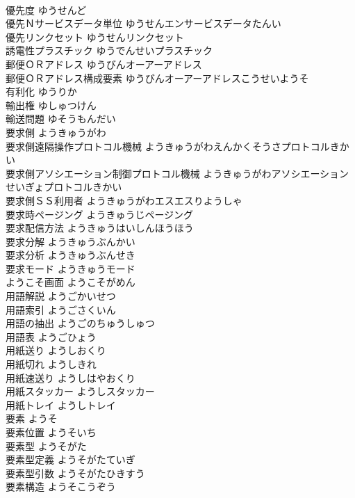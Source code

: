 \documentclass[8pt]{extreport}
\begin{document}
\begin{CJK}{UTF8}{min}
\\	優先度	ゆうせんど	
\\	優先Ｎサービスデータ単位	ゆうせんエンサービスデータたんい	
\\	優先リンクセット	ゆうせんリンクセット	
\\	誘電性プラスチック	ゆうでんせいプラスチック	
\\	郵便ＯＲアドレス	ゆうびんオーアーアドレス	
\\	郵便ＯＲアドレス構成要素	ゆうびんオーアーアドレスこうせいようそ	
\\	有利化	ゆうりか	
\\	輸出権	ゆしゅつけん	
\\	輸送問題	ゆそうもんだい	
\\	要求側	ようきゅうがわ	
\\	要求側遠隔操作プロトコル機械	ようきゅうがわえんかくそうさプロトコルきかい	
\\	要求側アソシエーション制御プロトコル機械	ようきゅうがわアソシエーションせいぎょプロトコルきかい	
\\	要求側ＳＳ利用者	ようきゅうがわエスエスりようしゃ	
\\	要求時ページング	ようきゅうじページング	
\\	要求配信方法	ようきゅうはいしんほうほう	
\\	要求分解	ようきゅうぶんかい	
\\	要求分析	ようきゅうぶんせき	
\\	要求モード	ようきゅうモード	
\\	ようこそ画面	ようこそがめん	
\\	用語解説	ようごかいせつ	
\\	用語索引	ようごさくいん	
\\	用語の抽出	ようごのちゅうしゅつ	
\\	用語表	ようごひょう	
\\	用紙送り	ようしおくり	
\\	用紙切れ	ようしきれ	
\\	用紙速送り	ようしはやおくり	
\\	用紙スタッカー	ようしスタッカー	
\\	用紙トレイ	ようしトレイ	
\\	要素	ようそ	
\\	要素位置	ようそいち	
\\	要素型	ようそがた	
\\	要素型定義	ようそがたていぎ	
\\	要素型引数	ようそがたひきすう	
\\	要素構造	ようそこうぞう	

\end{CJK}
\end{document}
